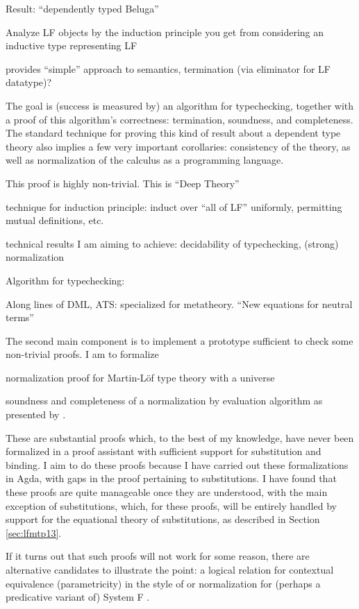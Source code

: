 \documentclass{article}
\begin{document}
Result: ``dependently typed Beluga''

Analyze LF objects by the induction principle you get from considering an inductive type representing LF

provides ``simple'' approach to semantics, termination (via eliminator for LF datatype)?

The goal is (success is measured by) an algorithm for typechecking,
together with a proof of this algorithm's correctness: termination,
soundness, and completeness. The standard technique for proving this
kind of result about a dependent type theory also implies a few very
important corollaries: consistency of the theory, as well as
normalization of the calculus as a programming language.

This proof is highly non-trivial. This is ``Deep Theory''

technique for induction principle: induct over ``all of LF'' uniformly, permitting mutual definitions, etc.

technical results I am aiming to achieve: decidability
  of typechecking, (strong) normalization

Algorithm for typechecking: \citep{Coquand91,Harper05,Abel11}

Along lines of DML, ATS: specialized for metatheory. ``New equations for neutral terms'' \cite{Allais13}

The second main component is to implement a prototype sufficient to
check some non-trivial proofs. I am to formalize 

\cite{Coquand98} normalization proof for Martin-L\"of type theory with a universe

soundness and completeness of a normalization by evaluation algorithm
as presented by \cite{Dybjer00}. 

These are substantial proofs which, to the best of my knowledge, have never been
formalized in a proof assistant with sufficient support for
substitution and binding. I aim to do these proofs because I have carried out these formalizations in
Agda, with gaps in the proof pertaining to substitutions. I have found
that these proofs are quite manageable once they are understood, with
the main exception of substitutions, which, for these proofs, will be
entirely handled by support for the equational theory of
substitutions, as described in Section \ref{sec:lfmtp13}.

If it turns out that such proofs will not work for some reason, there
are alternative candidates to illustrate the point: a logical relation
for contextual equivalence (parametricity) in the style of
\cite{Dreyer11} or normalization for (perhaps a predicative variant
of) System F \citep{ProofsAndTypes,Altenkirch93}.
\end{document}

